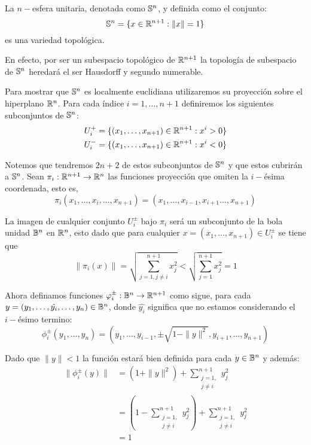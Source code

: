 \begin{example}[$n-$Esfera]\label{Ex: Variedad Topologica - Esfera}
	La $n-$esfera unitaria, denotada como $\S^n$, y definida como el conjunto:
	\[
		\S^n = \{x \in \R^{n+1}: \| x \| = 1 \}
	\]
	es una variedad topológica.

	En efecto, por ser un subespacio topológico de $\R^{n+1}$ la topología de subespacio de $\S^n$ heredará el ser Hausdorff y segundo numerable.

	Para mostrar que $\S^n$ es localmente euclidiana utilizaremos su proyección sobre el hiperplano $\R^{n}$. Para cada índice $i=1, \hdots, n+1$ definiremos los siguientes subconjuntos de $\S^n$:
	\begin{align*}
		U_{i}^{+} & = \{(x_1,\hdots,x_{n+1}) \in \R^{n+1}: x^i > 0\} \\
		U_{i}^{-} & = \{(x_1,\hdots,x_{n+1}) \in \R^{n+1}: x^i < 0\}
	\end{align*}

	Notemos que tendremos $2n + 2$ de estos subconjuntos de $\S^n$ y que estos cubrirán a $\S^n$. Sean $\pi_i: \R^{n+1} \to \R^n$ las funciones proyección que omiten la $i-$ésima coordenada, esto es,
	\[
		\pi_i(x_1,\hdots,x_i,\hdots,x_{n+1}) = (x_1,\hdots,x_{i-1},x_{i+1}\hdots,x_{n+1})
	\]

	La imagen de cualquier conjunto $U_{i}^{\pm}$ bajo $\pi_i$ será un subconjunto de la bola unidad $\B^n$ en $\R^n$, esto dado que para cualquier $x=(x_1, \hdots, x_{n+1}) \in U_{i}^{\pm}$ se tiene que
	\[
		\|\pi_i(x)\| = \sqrt{\sum_{j=1, j\neq i}^{n+1} x_j^2} < \sqrt{\sum_{j=1}^{n+1} x_j^2} = 1
	\]

	Ahora definamos funciones $\phi_i^{\pm}: \B^n \to \R^{n+1}$ como sigue, para cada $y=(y_1, \dots, \hat{y_i}, \dots, y_n) \in \B^n$, donde $\hat{y_i}$ significa que no estamos considerando el $i-$ésimo termino:
	\[
		\phi_{i}^{\pm}(y_1, \hdots, y_n) =  (y_1, \hdots, y_{i-1}, \pm\sqrt{1 - \|y\|^2}, y_{i+1}, \hdots, y_{n+1})
	\]

	Dado que $\|y\| < 1$ la función estará bien definida para cada $y \in \B^n$ y además:
	\begin{align*}
		\|\phi_i^{\pm}(y)\| & = (1 + \| y \|^{2}) + \sum_{\substack{j=1, \\ j \neq i}}^{n+1} y_j^2 \\
		                    & = (1 - \sum_{\substack{j=1,                \\ j \neq i}}^{n+1} y_j^2) + \sum_{\substack{j=1, \\ j \neq i}}^{n+1} y_j^2 \\
		                    & = 1
	\end{align*}


\end{example}
